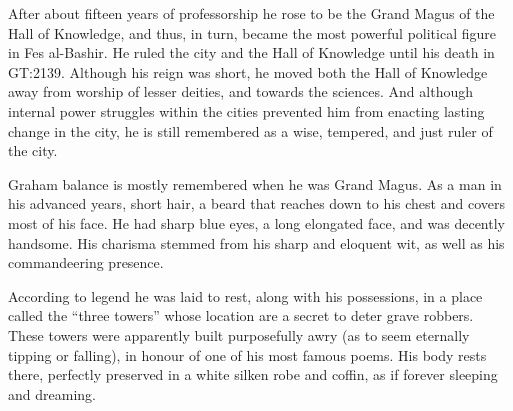 After about fifteen years of professorship he rose to be the Grand Magus of
the Hall of Knowledge, and thus, in turn, became the most powerful political
figure in Fes al-Bashir. He ruled the city and the Hall of Knowledge until his
death in GT:2139. Although his reign was short, he moved both the Hall of
Knowledge away from worship of lesser deities, and towards the sciences. And
although internal power struggles within the cities prevented him from
enacting lasting change in the city, he is still remembered as a wise,
tempered, and just ruler of the city.

Graham balance is mostly remembered when he was Grand Magus. As a man in his
advanced years, short hair, a beard that reaches down to his chest and covers
most of his face. He had sharp blue eyes, a long elongated face, and was
decently handsome. His charisma stemmed from his sharp and eloquent wit, as
well as his commandeering presence.

According to legend he was laid to rest, along with his possessions, in a
place called the ``three towers'' whose location are a secret to deter grave
robbers. These towers were apparently built purposefully awry (as to seem
eternally tipping or falling), in honour of one of his most famous poems. His
body rests there, perfectly preserved in a white silken robe and coffin, as if
forever sleeping and dreaming.

